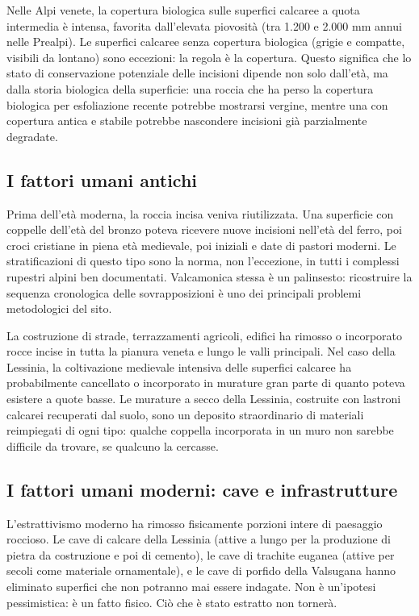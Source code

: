 Nelle Alpi venete, la copertura biologica sulle superfici calcaree a quota intermedia è intensa, favorita dall'elevata piovosità (tra 1.200 e 2.000 mm annui nelle Prealpi). Le superfici calcaree senza copertura biologica (grigie e compatte, visibili da lontano) sono eccezioni: la regola è la copertura. Questo significa che lo stato di conservazione potenziale delle incisioni dipende non solo dall'età, ma dalla storia biologica della superficie: una roccia che ha perso la copertura biologica per esfoliazione recente potrebbe mostrarsi vergine, mentre una con copertura antica e stabile potrebbe nascondere incisioni già parzialmente degradate.

\subsection{I fattori umani antichi}

Prima dell'età moderna, la roccia incisa veniva riutilizzata. Una superficie con coppelle dell'età del bronzo poteva ricevere nuove incisioni nell'età del ferro, poi croci cristiane in piena età medievale, poi iniziali e date di pastori moderni. Le stratificazioni di questo tipo sono la norma, non l'eccezione, in tutti i complessi rupestri alpini ben documentati. Valcamonica stessa è un palinsesto: ricostruire la sequenza cronologica delle sovrapposizioni è uno dei principali problemi metodologici del sito.

La costruzione di strade, terrazzamenti agricoli, edifici ha rimosso o incorporato rocce incise in tutta la pianura veneta e lungo le valli principali. Nel caso della Lessinia, la coltivazione medievale intensiva delle superfici calcaree ha probabilmente cancellato o incorporato in murature gran parte di quanto poteva esistere a quote basse. Le murature a secco della Lessinia, costruite con lastroni calcarei recuperati dal suolo, sono un deposito straordinario di materiali reimpiegati di ogni tipo: qualche coppella incorporata in un muro non sarebbe difficile da trovare, se qualcuno la cercasse.

\subsection{I fattori umani moderni: cave e infrastrutture}

L'estrattivismo moderno ha rimosso fisicamente porzioni intere di paesaggio roccioso. Le cave di calcare della Lessinia (attive a lungo per la produzione di pietra da costruzione e poi di cemento), le cave di trachite euganea (attive per secoli come materiale ornamentale), e le cave di porfido della Valsugana hanno eliminato superfici che non potranno mai essere indagate. Non è un'ipotesi pessimistica: è un fatto fisico. Ciò che è stato estratto non tornerà.

